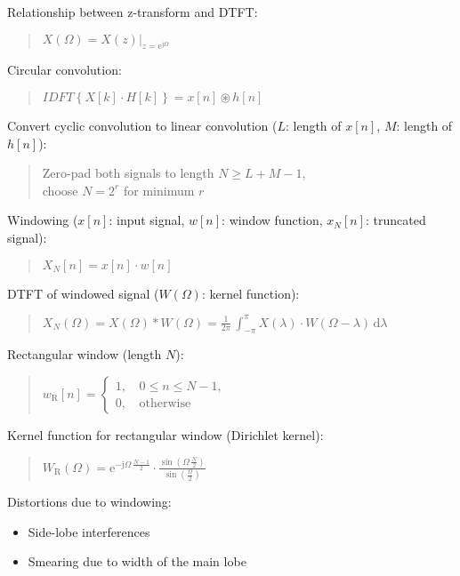 \documentclass[fontsize=9pt,a4paper,twocolumn]{scrartcl}
\begin{document}
Relationship between z-transform and DTFT:
\begin{quote}
	$X(\Omega) = \left.X(z)\right|_{z=\mathrm{e}^{\mathrm{j}\Omega}}$
\end{quote}
\newpage
Circular convolution:
\begin{quote}
	$IDFT\left\{X[k]\cdot H[k]\right\} = x[n]\circledast h[n]$
\end{quote}

Convert cyclic convolution to linear convolution ($L$: length of $x[n]$, $M$: length of $h[n]$):
\begin{quote}
	Zero-pad both signals to length $N\geq L+M-1$,\\
	choose $N=2^r$ for minimum $r$
\end{quote}

Windowing ($x[n]$: input signal, $w[n]$: window function, $x_N[n]$: truncated signal):
\begin{quote}
	$X_N[n] = x[n]\cdot w[n]$
\end{quote}

DTFT of windowed signal ($W(\Omega)$: kernel function):
\begin{quote}
	$X_N(\Omega) = X(\Omega)*W(\Omega)=\frac{1}{2\pi}\,\int_{-\pi}^\pi X(\lambda)\cdot W(\Omega-\lambda)\,\mathrm{d}\lambda$
\end{quote}

Rectangular window (length $N$):
\begin{quote}
$w_\mathrm{R}[n]=\begin{cases}1,\, & 0\leq n\leq N-1,\\ 0,\, & \text{otherwise}\end{cases}$
\end{quote}

Kernel function for rectangular window (Dirichlet kernel):
\begin{quote}
	$W_\mathrm{R}(\Omega) = \mathrm{e}^{-\mathrm{j}\Omega\,\frac{N-1}{2}}\cdot\frac{\sin\left(\Omega\,\frac{N}{2}\right)}{\sin\left(\frac{\Omega}{2}\right)}$
\end{quote}

Distortions due to windowing:
\begin{itemize}
	\item Side-lobe interferences
	\item Smearing due to width of the main lobe
\end{itemize}
\end{document}
